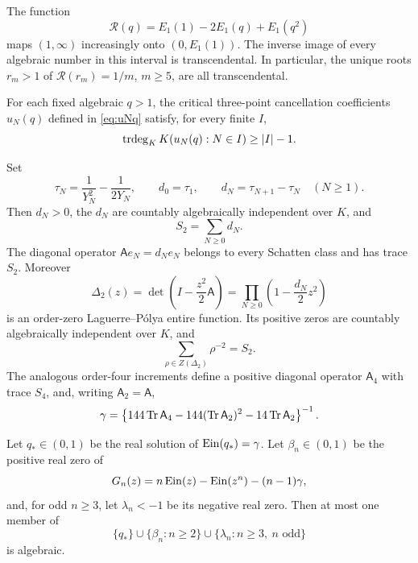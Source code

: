 \begin{theorem}
\label{thm:intro-inverse}
The function
\[
 \mathscr R(q)=E_1(1)-2E_1(q)+E_1(q^2)
\]
maps \((1,\infty)\) increasingly onto \((0,E_1(1))\).  The inverse image of
every algebraic number in this interval is transcendental.  In particular,
the unique roots \(r_m>1\) of \(\mathscr R(r_m)=1/m\), \(m\ge5\), are all
transcendental.

For each fixed algebraic \(q>1\), the critical three-point cancellation
coefficients \(u_N(q)\) defined in \eqref{eq:uNq} satisfy, for every finite
\(I\),
\[
 \operatorname{trdeg}_KK(u_N(q):N\in I)\ge |I|-1.
\]
\end{theorem}

\begin{theorem}
\label{thm:intro-positive}
Set
\[
 \tau_N=\frac1{Y_N^2}-\frac1{2Y_N},\qquad
 d_0=\tau_1,\qquad d_N=\tau_{N+1}-\tau_N\quad(N\ge1).
\]
Then \(d_N>0\), the \(d_N\) are countably algebraically independent over
\(K\), and
\[
 S_2=\sum_{N\ge0}d_N.
\]
The diagonal operator \(\mathsf A e_N=d_Ne_N\) belongs to every Schatten
class and has trace \(S_2\).  Moreover
\[
 \Delta_2(z)=\det\!\left(I-\frac{z^2}{2}\mathsf A\right)
 =\prod_{N\ge0}\left(1-\frac{d_N}{2}z^2\right)
\]
is an order-zero Laguerre--P\'olya entire function.  Its positive zeros are
countably algebraically independent over \(K\), and
\[
 \sum_{\rho\in Z(\Delta_2)}\rho^{-2}=S_2.
\]
The analogous order-four increments define a positive diagonal operator
\(\mathsf A_4\) with trace \(S_4\), and, writing
\(\mathsf A_2=\mathsf A\),
\[
 \gamma=
 \left\{144\operatorname{Tr}\mathsf A_4
 -144(\operatorname{Tr}\mathsf A_2)^2-14\operatorname{Tr}\mathsf A_2\right\}^{-1}.
\]
\end{theorem}

\begin{theorem}
\label{thm:intro-witness}
Let \(q_*\in(0,1)\) be the real solution of \(\operatorname{Ein}(q_*)=\gamma\).  Let
\(\beta_n\in(0,1)\) be the positive real zero of
\[
 G_n(z)=n\operatorname{Ein}(z)-\operatorname{Ein}(z^n)-(n-1)\gamma,
\]
and, for odd \(n\ge3\), let \(\lambda_n<-1\) be its negative real zero.
Then at most one member of
\[
 \{q_*\}\cup\{\beta_n:n\ge2\}
 \cup\{\lambda_n:n\ge3,\ n\text{ odd}\}
\]
is algebraic.
\end{theorem}


